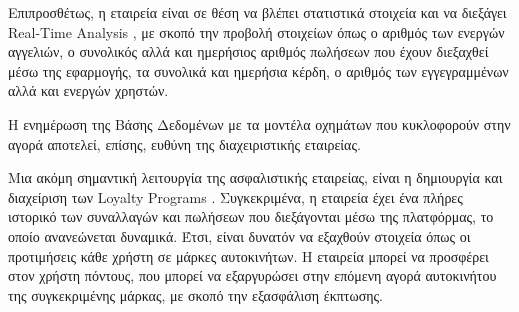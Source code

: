 \documentclass{../ol-softwaremanual}
\begin{document}
	Επιπροσθέτως, η εταιρεία είναι σε θέση να βλέπει στατιστικά στοιχεία και να διεξάγει \en Real-Time Analysis \gr, με σκοπό την προβολή στοιχείων όπως ο αριθμός των ενεργών αγγελιών, ο συνολικός αλλά και ημερήσιος αριθμός πωλήσεων που έχουν διεξαχθεί μέσω της εφαρμογής, τα συνολικά και ημερήσια κέρδη, ο αριθμός των εγγεγραμμένων αλλά και ενεργών χρηστών. \break 
	
	Η ενημέρωση της Βάσης Δεδομένων με τα μοντέλα οχημάτων που κυκλοφορούν στην αγορά αποτελεί, επίσης, ευθύνη της διαχειριστικής εταιρείας. \break
	
	Μια ακόμη σημαντική λειτουργία της ασφαλιστικής εταιρείας, είναι η δημιουργία και διαχείριση των \en Loyalty Programs \gr. Συγκεκριμένα, η εταιρεία έχει ένα πλήρες ιστορικό των συναλλαγών και πωλήσεων που διεξάγονται μέσω της πλατφόρμας, το οποίο ανανεώνεται δυναμικά. Έτσι, είναι δυνατόν να εξαχθούν στοιχεία όπως οι προτιμήσεις κάθε χρήστη σε μάρκες αυτοκινήτων. Η εταιρεία μπορεί να προσφέρει στον χρήστη πόντους, που μπορεί να εξαργυρώσει στην επόμενη αγορά αυτοκινήτου της συγκεκριμένης μάρκας, με σκοπό την εξασφάλιση έκπτωσης. \break 
	
	
	
	\newpage
	
	 \gr
	
	
	
\end{document}
